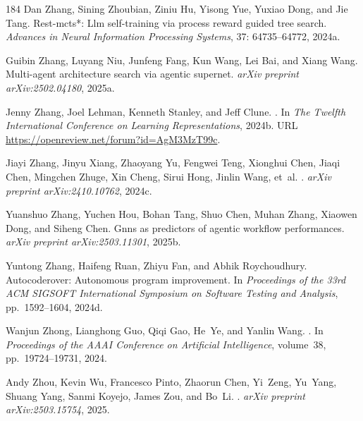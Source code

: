 \begin{thebibliography}{184}
Dan Zhang, Sining Zhoubian, Ziniu Hu, Yisong Yue, Yuxiao Dong, and Jie Tang.
\newblock Rest-mcts*: Llm self-training via process reward guided tree search.
\newblock \emph{Advances in Neural Information Processing Systems},
  37: 64735--64772, 2024{a}.

Guibin Zhang, Luyang Niu, Junfeng Fang, Kun Wang, Lei Bai, and Xiang Wang.
\newblock Multi-agent architecture search via agentic supernet.
\newblock \emph{arXiv preprint arXiv:2502.04180}, 2025{a}.

Jenny Zhang, Joel Lehman, Kenneth Stanley, and Jeff Clune.
.
\newblock In \emph{The Twelfth International Conference on Learning
  Representations}, 2024{b}.
\newblock URL \url{https://openreview.net/forum?id=AgM3MzT99c}.

Jiayi Zhang, Jinyu Xiang, Zhaoyang Yu, Fengwei Teng, Xionghui Chen, Jiaqi Chen,
  Mingchen Zhuge, Xin Cheng, Sirui Hong, Jinlin Wang, et~al.
.
\newblock \emph{arXiv preprint arXiv:2410.10762}, 2024{c}.

Yuanshuo Zhang, Yuchen Hou, Bohan Tang, Shuo Chen, Muhan Zhang, Xiaowen Dong,
  and Siheng Chen.
\newblock Gnns as predictors of agentic workflow performances.
\newblock \emph{arXiv preprint arXiv:2503.11301}, 2025{b}.

Yuntong Zhang, Haifeng Ruan, Zhiyu Fan, and Abhik Roychoudhury.
\newblock Autocoderover: Autonomous program improvement.
\newblock In \emph{Proceedings of the 33rd ACM SIGSOFT International Symposium
  on Software Testing and Analysis}, pp.\  1592--1604, 2024{d}.

Wanjun Zhong, Lianghong Guo, Qiqi Gao, He~Ye, and Yanlin Wang.
.
\newblock In \emph{Proceedings of the AAAI Conference on Artificial
  Intelligence}, volume~38, pp.\  19724--19731, 2024.

Andy Zhou, Kevin Wu, Francesco Pinto, Zhaorun Chen, Yi~Zeng, Yu~Yang, Shuang
  Yang, Sanmi Koyejo, James Zou, and Bo~Li.
.
\newblock \emph{arXiv preprint arXiv:2503.15754}, 2025.


\end{thebibliography}
